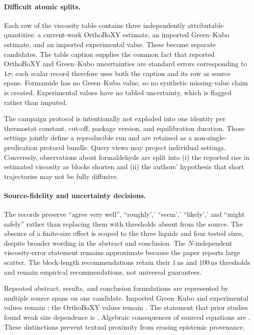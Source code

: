 \paragraph{Difficult atomic splits.}
Each row of the viscosity table contains three independently attributable quantities: a current-work OrthoBoXY estimate, an imported Green--Kubo estimate, and an imported experimental value. These become separate candidates. The table caption supplies the common fact that reported OrthoBoXY and Green--Kubo uncertainties are standard errors corresponding to $1\sigma$; each scalar record therefore uses both the caption and its row as source spans. Formamide has no Green--Kubo value, so no synthetic missing-value claim is created. Experimental values have no tabled uncertainty, which is flagged rather than imputed.

The campaign protocol is intentionally not exploded into one identity per thermostat constant, cut-off, package version, and equilibration duration. Those settings jointly define a reproducible run and are retained as a non-single-predication protocol bundle. Query views may project individual settings. Conversely, observations about formaldehyde are split into (i) the reported rise in estimated viscosity as blocks shorten and (ii) the authors' hypothesis that short trajectories may not be fully diffusive.

\paragraph{Source-fidelity and uncertainty decisions.}
The records preserve ``agree very well'', ``roughly',' ``seem',' ``likely',' and ``might safely'' rather than replacing them with thresholds absent from the source. The absence of a finite-size effect is scoped to the three liquids and four tested sizes, despite broader wording in the abstract and conclusion. The $N$-independent viscosity-error statement remains approximate because the paper reports large scatter. The block-length recommendations retain their $1\,\mathrm{ns}$ and $100\,\mathrm{ns}$ thresholds and remain empirical recommendations, not universal guarantees.

Repeated abstract, results, and conclusion formulations are represented by multiple source spans on one candidate. Imported Green--Kubo and experimental values remain ; the OrthoBoXY values remain . The statement that prior studies found weak size dependence is . Algebraic consequences of sourced equations are . These distinctions prevent textual proximity from erasing epistemic provenance.

